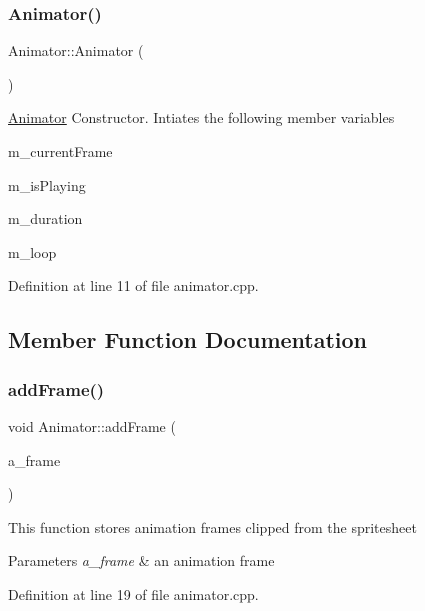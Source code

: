\subsubsection{\texorpdfstring{Animator()}{Animator()}}
{\footnotesize\ttfamily Animator\+::\+Animator (\begin{DoxyParamCaption}{ }\end{DoxyParamCaption})}

\hyperlink{class_animator}{Animator} Constructor. Intiates the following member variables
\begin{DoxyItemize}
\item m\+\_\+current\+Frame
\item m\+\_\+is\+Playing
\item m\+\_\+duration
\item m\+\_\+loop 
\end{DoxyItemize}

Definition at line 11 of file animator.\+cpp.



\subsection{Member Function Documentation}
\mbox{\label{class_animator_a69e57eedcfb49c3b6d7802ff906486b7}} 
\subsubsection{\texorpdfstring{add\+Frame()}{addFrame()}}
{\footnotesize\ttfamily void Animator\+::add\+Frame (\begin{DoxyParamCaption}\item[{sf\+::\+Int\+Rect}]{a\+\_\+frame }\end{DoxyParamCaption})}

This function stores animation frames clipped from the spritesheet


\begin{DoxyParams}{Parameters}
{\em a\+\_\+frame} & an animation frame \\
\hline
\end{DoxyParams}


Definition at line 19 of file animator.\+cpp.

\mbox{\label{class_animator_acb1e3abc21b1ea2133baa4bd089062a0}} 
